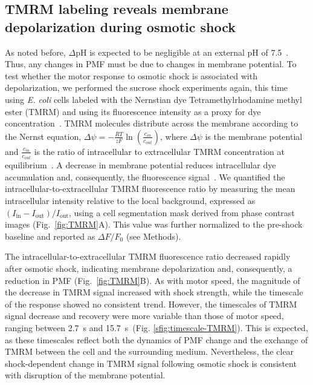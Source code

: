 \documentclass[twocolumn]{biophys-new}%
\begin{document}
\subsection*{TMRM labeling reveals membrane depolarization during osmotic shock} 
As noted before, $\Delta$pH is expected to be negligible at an external pH of 7.5~\cite{padan1976,slonczewski1981}. Thus, any changes in PMF must be due to changes in membrane potential. To test whether the motor response to osmotic shock is associated with depolarization, we performed the sucrose shock experiments again, this time using \textit{E. coli} cells labeled with the Nernstian dye Tetramethylrhodamine methyl ester (TMRM) and using its fluorescence intensity as a proxy for dye concentration~\cite{LO2007etl,KRASNOPEEVA2019l}. TMRM molecules distribute across the membrane according to the Nernst equation, $\Delta\psi = -\frac{RT}{zF} \ln (\frac{c_{in}} {c_{out}})$, where $\Delta\psi$ is the membrane potential and $\frac{c_{in}} {c_{out}}$ is the ratio of intracellular to extracellular TMRM concentration at equilibrium~\cite{Ehrenberg1988membrane,Farkas1989simultaneous,BENARROCH2020304l}. A decrease in membrane potential reduces intracellular dye accumulation and, consequently, the fluorescence signal~\cite{jinetal2023l,KRASNOPEEVA2019l}. We quantified the intracellular-to-extracellular TMRM fluorescence ratio by measuring the mean intracellular intensity relative to the local background, expressed as $(I_{\mathrm{in}} - I_{\mathrm{out}})/I_{\mathrm{out}}$, using a cell segmentation mask derived from phase contrast images (Fig.~\ref{fig:TMRM}A). This value was further normalized to the pre-shock baseline and reported as $\Delta F/F_{0}$ (see Methods).

The intracellular-to-extracellular TMRM fluorescence ratio decreased rapidly after osmotic shock, indicating membrane depolarization and, consequently, a reduction in PMF (Fig.~\ref{fig:TMRM}B). As with motor speed, the magnitude of the decrease in TMRM signal increased with shock strength, while the timescale of the response showed no consistent trend. However, the timescales of TMRM signal decrease and recovery were more variable than those of motor speed, ranging between 2.7~s and 15.7~s~(Fig. \ref{sfig:timescale-TMRM}). This is expected, as these timescales reflect both the dynamics of PMF change and the exchange of TMRM between the cell and the surrounding medium. Nevertheless, the clear shock-dependent change in TMRM signal following osmotic shock is consistent with disruption of the membrane potential.
\end{document}
